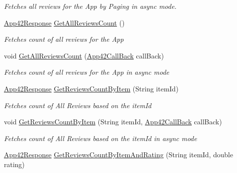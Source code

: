 \begin{DoxyCompactItemize}
\begin{DoxyCompactList}\small\item\em Fetches all reviews for the App by Paging in async mode. \end{DoxyCompactList}\item 
\hyperlink{classcom_1_1shephertz_1_1app42_1_1paas_1_1sdk_1_1csharp_1_1_app42_response}{App42\+Response} \hyperlink{classcom_1_1shephertz_1_1app42_1_1paas_1_1sdk_1_1csharp_1_1review_1_1_review_service_a7ea2414776195d30c98e4fe21e328420}{Get\+All\+Reviews\+Count} ()
\begin{DoxyCompactList}\small\item\em Fetches count of all reviews for the App \end{DoxyCompactList}\item 
void \hyperlink{classcom_1_1shephertz_1_1app42_1_1paas_1_1sdk_1_1csharp_1_1review_1_1_review_service_a39f3a055c823e2eea3376809ea743f15}{Get\+All\+Reviews\+Count} (\hyperlink{interfacecom_1_1shephertz_1_1app42_1_1paas_1_1sdk_1_1csharp_1_1_app42_call_back}{App42\+Call\+Back} call\+Back)
\begin{DoxyCompactList}\small\item\em Fetches count of all reviews for the App in async mode \end{DoxyCompactList}\item 
\hyperlink{classcom_1_1shephertz_1_1app42_1_1paas_1_1sdk_1_1csharp_1_1_app42_response}{App42\+Response} \hyperlink{classcom_1_1shephertz_1_1app42_1_1paas_1_1sdk_1_1csharp_1_1review_1_1_review_service_af215c61e7bc4e1e747f0fb9e47864a78}{Get\+Reviews\+Count\+By\+Item} (String item\+Id)
\begin{DoxyCompactList}\small\item\em Fetches count of All Reviews based on the item\+Id \end{DoxyCompactList}\item 
void \hyperlink{classcom_1_1shephertz_1_1app42_1_1paas_1_1sdk_1_1csharp_1_1review_1_1_review_service_a76bf0c8c7d3bf0eddde431dcc6e7adb4}{Get\+Reviews\+Count\+By\+Item} (String item\+Id, \hyperlink{interfacecom_1_1shephertz_1_1app42_1_1paas_1_1sdk_1_1csharp_1_1_app42_call_back}{App42\+Call\+Back} call\+Back)
\begin{DoxyCompactList}\small\item\em Fetches count of All Reviews based on the item\+Id in async mode \end{DoxyCompactList}\item 
\hyperlink{classcom_1_1shephertz_1_1app42_1_1paas_1_1sdk_1_1csharp_1_1_app42_response}{App42\+Response} \hyperlink{classcom_1_1shephertz_1_1app42_1_1paas_1_1sdk_1_1csharp_1_1review_1_1_review_service_af8b79f39883883817b844aa6f54df0f7}{Get\+Reviews\+Count\+By\+Item\+And\+Rating} (String item\+Id, double rating)

\end{DoxyCompactItemize}
